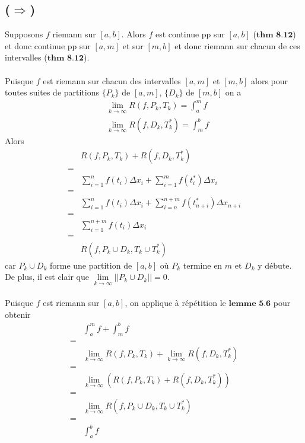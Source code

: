 \documentclass[a4paper,10pt]{article}
\begin{document}
\subsection*{($\Rightarrow$)}
Supposons $f$ riemann sur $[a,b]$. Alors $f$ est continue pp sur $[a,b]$ ($\textbf{thm 8.12}$) et donc continue pp sur 
$[a,m]$ et sur $[m,b]$ et donc riemann sur chacun de ces intervalles ($\textbf{thm 8.12}$). 
\\
\\
Puisque $f$ est riemann sur chacun des intervalles $[a,m]$ et $[m,b]$ alors pour toutes suites de partitions $\{P_k\}$ de 
$[a,m]$, $\{D_k\}$ de $[m,b]$ on a 
\begin{align*}
  & \lim\limits_{k \to \infty} R(f, P_k, T_k) = \int_a^m f \\
  & \lim\limits_{k \to \infty} R(f, D_k, T_k^*) = \int_m^b f
\end{align*}
Alors 
\begin{align*}
 & R(f, P_k, T_k) + R(f, D_k, T_k^*) \\
 = \\
 & \sum_{i = 1}^n f(t_i) \Delta x_i + \sum_{i = 1}^m f(t_i^*) \Delta x_i \\
 = \\
 & \sum_{i = 1}^n f(t_i) \Delta x_i + \sum_{i = n}^{n+m} f(t_{n+i}^*) \Delta x_{n+i} \\
 = \\
 & \sum_{i = 1}^{n+m} f(t_i) \Delta x_i \\
 = \\
 & R(f, P_k \cup D_k, T_k \cup T_k^*)
\end{align*}
car $P_k \cup D_k$ forme une partition de $[a,b]$ où $P_k$ termine en $m$ et $D_k$ y débute. De plus, il est clair
que $\lim\limits_{k \to \infty} || P_k \cup D_k || = 0$.
\\
\\
Puisque $f$ est riemann sur $[a,b]$, on applique à répétition le $\textbf{lemme 5.6}$ pour obtenir
\begin{align*}
 & \int_a^m f + \int_m^b f \\
 = \\
 &  \lim\limits_{k \to \infty} R(f, P_k, T_k) + \lim\limits_{k \to \infty} R(f, D_k, T_k^*) \\
 = \\
 & \lim\limits_{k \to \infty}(R(f, P_k, T_k) + R(f, D_k, T_k^*)) \\
 = \\
 & \lim\limits_{k \to \infty} R(f, P_k \cup D_k, T_k \cup T_k^*) \\
 = \\
 & \int_a^b f
\end{align*}
\end{document}
